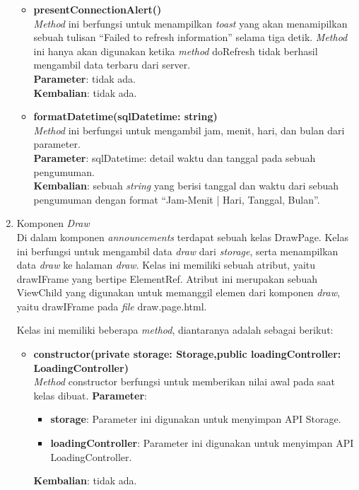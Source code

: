 \begin{enumerate}
\begin{itemize}
		\item \textbf{presentConnectionAlert()} \\
		\textit{Method} ini berfungsi untuk menampilkan \textit{toast} yang akan menamipilkan sebuah tulisan ``Failed to refresh information'' selama tiga detik. \textit{Method} ini hanya akan digunakan ketika \textit{method} doRefresh tidak berhasil mengambil data terbaru dari server.\\
		\textbf{Parameter}: tidak ada.\\
		\textbf{Kembalian}: tidak ada.
		\newpage
		\item \textbf{formatDatetime(sqlDatetime: string)} \\
		\textit{Method} ini berfungsi untuk mengambil jam, menit, hari, dan bulan dari parameter. \\
		\textbf{Parameter}: sqlDatetime: detail waktu dan tanggal pada sebuah pengumuman. \\
		\textbf{Kembalian}: sebuah \textit{string} yang berisi tanggal dan waktu dari sebuah pengumuman dengan format ``Jam-Menit | Hari, Tanggal, Bulan''.
	\end{itemize}
	
	\item Komponen \textit{Draw} \\
	Di dalam komponen \textit{announcements} terdapat sebuah kelas DrawPage. Kelas ini berfungsi untuk mengambil data \textit{draw} dari \textit{storage}, serta menampilkan data \textit{draw} ke halaman \textit{draw}. Kelas ini memiliki sebuah atribut, yaitu drawIFrame yang bertipe ElementRef. Atribut ini merupakan sebuah ViewChild yang digunakan untuk memanggil elemen dari komponen \textit{draw}, yaitu drawIFrame pada \textit{file} draw.page.html. 
	
	Kelas ini memiliki beberapa \textit{method}, diantaranya adalah sebagai berikut:
	
	\begin{itemize}
		\item \textbf{constructor(private storage: Storage,public loadingController: LoadingController)}\\
			\textit{Method} constructor berfungsi untuk memberikan nilai awal pada saat kelas dibuat.
			\textbf{Parameter}:
			\begin{itemize}
				\item \textbf{storage}: Parameter ini digunakan untuk menyimpan API Storage.
				\item \textbf{loadingController}: Parameter ini digunakan untuk menyimpan API LoadingController.
			\end{itemize}
			\textbf{Kembalian}: tidak ada.


\end{itemize}
\end{enumerate}
